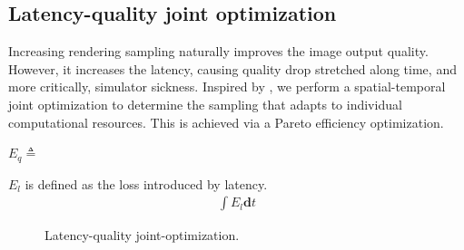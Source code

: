 \subsection{Latency-quality joint optimization}
\label{sec:method:optimization}
Increasing rendering sampling naturally improves the image output quality. However, it increases the latency, causing quality drop stretched along time, and more critically, simulator sickness.
Inspired by \cite{Li:2020:TSP}, we perform a spatial-temporal joint optimization to determine the sampling that adapts to individual computational resources. This is achieved via a Pareto efficiency optimization. 

$E_{q}\triangleq $

$E_{l}$ is defined as the loss introduced by latency. 
\begin{align}
    \int E_{l} \mathbf{d} t
\end{align}

\begin{figure}
    \centering
    \caption{Latency-quality joint-optimization.}
    \label{fig:optimization}
\end{figure}

